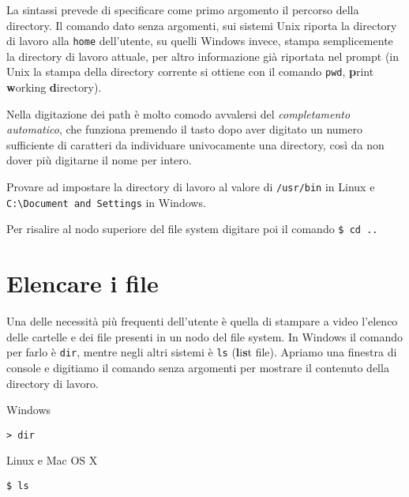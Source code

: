 La sintassi prevede di specificare come primo argomento il percorso della directory. Il comando dato senza argomenti, sui sistemi Unix riporta la directory di lavoro alla \texttt{home} dell'utente, su quelli Windows invece, stampa semplicemente la directory di lavoro attuale, per altro informazione già riportata nel prompt (in Unix la stampa della directory corrente si ottiene con il comando \texttt{pwd}, \textbf{p}rint \textbf{w}orking \textbf{d}irectory).

Nella digitazione dei path è molto comodo avvalersi del \emph{completamento automatico}, che funziona premendo il tasto  dopo aver digitato un numero sufficiente di caratteri da individuare univocamente una directory, così da non dover più digitarne il nome per intero.

Provare ad impostare la directory di lavoro al valore di \verb=/usr/bin= in Linux e \verb=C:\Document and Settings= in Windows.

Per risalire al nodo superiore del file system digitare poi il comando \verb=$ cd ..=

\section{Elencare i file}

Una delle necessità più frequenti dell'utente è quella di stampare a video l'elenco delle cartelle e dei file presenti in un nodo del file system. In Windows il comando per farlo è \texttt{dir}, mentre negli altri sistemi è \texttt{ls} (\textbf{l}i\textbf{s}t file). Apriamo una finestra di console e digitiamo il comando senza argomenti per mostrare il contenuto della directory di lavoro.

\noindent\begin{tcolorbox}[width=(\linewidth-6pt)/2,before=,after=\hfill]
Windows\tcblower
\begin{verbatim}
> dir
\end{verbatim}
\end{tcolorbox}
\begin{tcolorbox}[width=(\linewidth-6pt)/2,before=,after=\hfill]
Linux e Mac OS X\tcblower
\begin{verbatim}
$ ls
\end{verbatim}
\end{tcolorbox}



